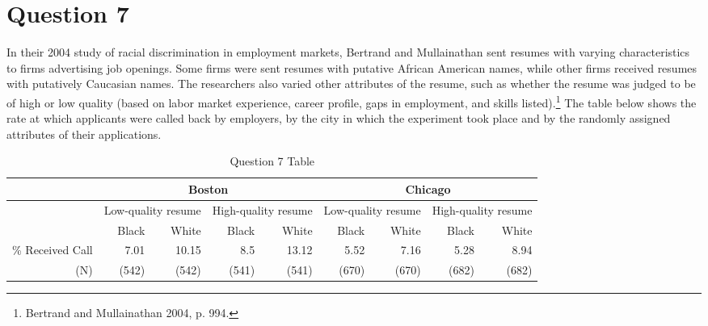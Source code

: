 \documentclass[11pt,notitlepage]{article}\usepackage[]{graphicx}\usepackage[]{color}
\begin{document}
\section*{Question 7}
In their 2004 study of racial discrimination in employment markets, Bertrand and Mullainathan sent resumes with varying characteristics to firms advertising job openings. Some firms were sent resumes with putative African American names, while other firms received resumes with putatively Caucasian names. The researchers also varied other attributes of the resume, such as whether the resume was judged to be of high or low quality (based on labor market experience, career profile, gaps in employment, and skills listed).\footnote{Bertrand and Mullainathan 2004, p. 994.} The table below shows the rate at which applicants were called back by employers, by the city in which the experiment took place and by the randomly assigned attributes of their applications.

\begin{table}[H]
  \centering
  \caption{Question 7 Table}
    \begin{tabular}{rrrrrrrrr}
    \toprule
          & \multicolumn{4}{c}{Boston}    & \multicolumn{4}{c}{Chicago} \\
    \midrule
          & \multicolumn{2}{c}{Low-quality resume} & \multicolumn{2}{c}{High-quality resume } & \multicolumn{2}{c}{Low-quality resume} & \multicolumn{2}{c}{High-quality resume } \\
          & Black & White & Black & White & Black & White & Black & White \\
    \% Received Call & 7.01  & 10.15 & 8.5   & 13.12 & 5.52  & 7.16  & 5.28  & 8.94 \\
    (N)   & (542) & (542) & (541) & (541) & (670) & (670) & (682) & (682) \\
    \bottomrule
    \end{tabular}%
  \label{tab:addlabel}%
\end{table}%
\end{document}
